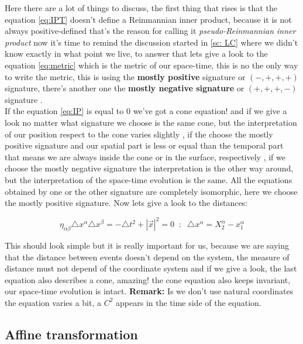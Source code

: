 \documentclass[spanish,notitlepage,letterpaper,11pt]{article} %
\begin{document}
Here there are a lot of things to discuss, the first thing that rises is that the equation \ref{eq:IPT} doesn't define a Reinmannian inner product, because it is not always positive-defined that's the reason for calling it \textit{pseudo-Reinmannian inner product} now it's time to remind the 
discussion started in \ref{sc: LC} where we didn't know exactly in what point we live, to answer that lets give a look to the equation \ref{eq:metric} which is the metric of our space-time, this is no the only way to write the metric, this is using the \textbf{mostly positive} signature or $(-,+,+,+)$ signature, there's another one the \textbf{mostly negative signature} or $(+,+,+,-)$ signature .\\

If the equation \ref{eq:IP} is equal to $0$ we've got a cone equation! and if we give a look no matter what signature we choose is the same cone, but the interpretation of our position respect to the cone varies slightly , if the choose the mostly positive signature and our spatial part is less or equal than the temporal part that means we are always inside the cone or in the surface, respectively , if we choose the mostly negative signature the interpretation is the other way around, but the interpretation of the space-time evolution is the same. All the equations obtained by one or the other signature are completely isomorphic, here we choose the mostly positive signature. Now lets give a look to the distances:

\begin{equation*}
    \eta_{\alpha\beta}\triangle x^{\alpha}\triangle x^{\beta} = -\triangle t^2 + |\vec{x}|^2 = 0 \;\; : \;\; \triangle x^{\alpha} = X_2^{\alpha} - x_1^{\alpha}
\end{equation*}

This should look simple but it is really important for us, because we are saying that the distance between events doesn't depend on the system, the measure of distance must not depend of the coordinate system and if we give a look, the last equation also describes a cone, amazing! the cone equation also keeps invariant, our space-time evolution is intact. \textbf{Remark:} Is we don't use natural coordinates the equation varies a bit, a $C^2$ appears in the time side of the equation.

\subsection{Affine transformation}
\end{document}
